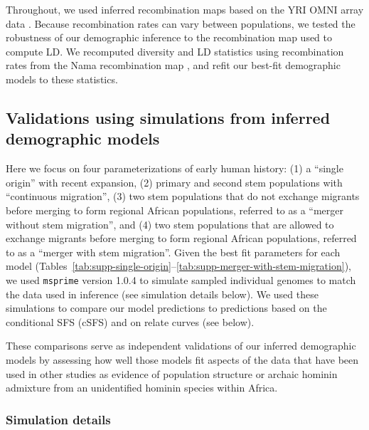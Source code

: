 \documentclass[]{article}
\newcommand{\msprime}{\texttt{msprime}\xspace}
\begin{document}
Throughout, we used inferred recombination maps based on the YRI OMNI array
data \citep{1000_Genomes_Project_Consortium2015-zq}. Because recombination
rates can vary between populations, we tested the robustness of our demographic
inference to the recombination map used to compute LD. We recomputed diversity
and LD statistics using recombination rates from the Nama recombination map
\citep{Van_Eeden2021-od}, and refit our best-fit demographic models to these
statistics.

\subsection{Validations using simulations from inferred demographic models}

Here we focus on four parameterizations of early human history: (1) a “single
origin” with recent expansion, (2) primary and second stem populations with
“continuous migration”, (3) two stem populations that do not exchange migrants
before merging to form regional African populations, referred to as a “merger
without stem migration”, and (4) two stem populations that are allowed to
exchange migrants before merging to form regional African populations, referred
to as a “merger with stem migration”. Given the best fit parameters for each
model
(Tables~\ref{tab:supp-single-origin}--\ref{tab:supp-merger-with-stem-migration}),
we used \msprime version 1.0.4 \citep{Kelleher2016-lw,Baumdicker2022-mj} to
simulate sampled individual genomes to match the data used in inference (see
simulation details below). We used these simulations to compare our model predictions to 
predictions based on the conditional SFS (cSFS) and on relate curves (see below).  

These comparisons serve as independent validations
of our inferred demographic models by assessing how well those models fit
aspects of the data that have been used in other studies as evidence of
population structure or archaic hominin admixture from an unidentified hominin species
within Africa.

\subsubsection{Simulation details}
\end{document}

